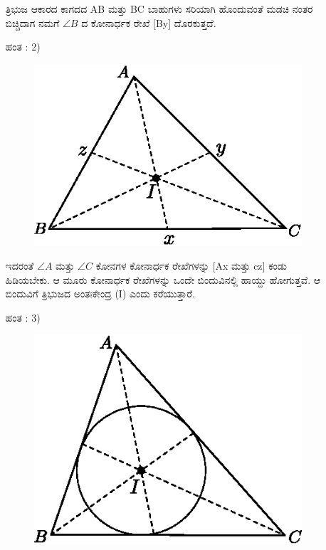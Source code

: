 \begin{enumerate}
\begin{itemize}
 
 ತ್ರಿಭುಜ ಆಕಾರದ ಕಾಗದದ  AB ಮತ್ತು BC ಬಾಹುಗಳು ಸರಿಯಾಗಿ ಹೊಂದುವಂತೆ ಮಡಚಿ ನಂತರ ಬಿಚ್ಚಿದಾಗ ನಮಗೆ $\angle B$ ದ ಕೋನಾರ್ಧಕ ರೇಖೆ  [By] ದೊರಕುತ್ತದೆ. 
 
 \item[ಹಂತ : 2)] 
 ~
 \begin{figure}[H]
\centering
\includegraphics[scale=.98]{src/figure/chap1/fig1-37b.eps}
\end{figure}
 
 
 ಇದರಂತೆ  $\angle A$ ಮತ್ತು  $\angle C$ ಕೋನಗಳ ಕೋನಾರ್ಧಕ ರೇಖೆಗಳನ್ನು [Ax ಮತ್ತು  cz] ಕಂಡು ಹಿಡಿಯಬೇಕು. ಆ ಮೂರು ಕೋನಾರ್ಧಕ ರೇಖೆಗಳನ್ನು ಒಂದೇ ಬಿಂದುವಿನಲ್ಲಿ ಹಾಯ್ದು ಹೋಗುತ್ತವೆ. ಆ ಬಿಂದುವಿಗೆ ತ್ರಿಭುಜದ ಅಂತಃಕೇಂದ್ರ  (I) ಎಂದು ಕರೆಯುತ್ತಾರೆ. 
 
  \item[ಹಂತ : 3)] 
 ~
  \begin{figure}[H]
\centering
\includegraphics[scale=.98]{src/figure/chap1/fig1-37c.eps}
\end{figure}
 

\end{itemize}
\end{enumerate}
